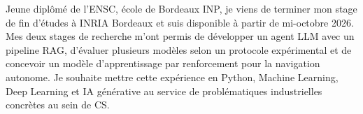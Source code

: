 
\begin{cvparagraph}
Jeune diplômé de l’ENSC, école de Bordeaux INP, je viens de terminer mon stage de fin d’études à INRIA Bordeaux et suis disponible à partir de mi-octobre 2026. Mes deux stages de recherche m’ont permis de développer un agent LLM avec un pipeline RAG, d’évaluer plusieurs modèles selon un protocole expérimental et de concevoir un modèle d’apprentissage par renforcement pour la navigation autonome. Je souhaite mettre cette expérience en Python, Machine Learning, Deep Learning et IA générative au service de problématiques industrielles concrètes au sein de CS.
\end{cvparagraph}
